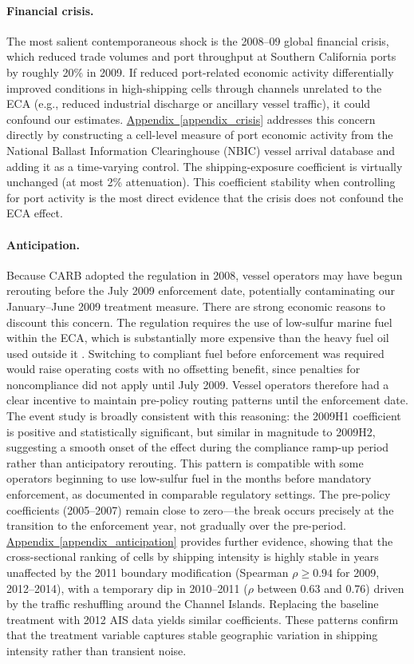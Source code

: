 \documentclass[12pt]{article}
\begin{document}
\paragraph{Financial crisis.} The most salient contemporaneous shock is the 2008--09 global financial crisis, which reduced trade volumes and port throughput at Southern California ports by roughly 20\% in 2009. If reduced port-related economic activity differentially improved conditions in high-shipping cells through channels unrelated to the ECA (e.g., reduced industrial discharge or ancillary vessel traffic), it could confound our estimates. \hyperref[appendix_crisis]{Appendix~\ref*{appendix_crisis}} addresses this concern directly by constructing a cell-level measure of port economic activity from the National Ballast Information Clearinghouse (NBIC) vessel arrival database and adding it as a time-varying control. The shipping-exposure coefficient is virtually unchanged (at most 2\% attenuation). This coefficient stability when controlling for port activity is the most direct evidence that the crisis does not confound the ECA effect.

\paragraph{Anticipation.} Because CARB adopted the regulation in 2008, vessel operators may have begun rerouting before the July 2009 enforcement date, potentially contaminating our January--June 2009 treatment measure. There are strong economic reasons to discount this concern. The regulation requires the use of low-sulfur marine fuel within the ECA, which is substantially more expensive than the heavy fuel oil used outside it \citep{Klotz2022}. Switching to compliant fuel before enforcement was required would raise operating costs with no offsetting benefit, since penalties for noncompliance did not apply until July 2009. Vessel operators therefore had a clear incentive to maintain pre-policy routing patterns until the enforcement date. The event study is broadly consistent with this reasoning: the 2009H1 coefficient is positive and statistically significant, but similar in magnitude to 2009H2, suggesting a smooth onset of the effect during the compliance ramp-up period rather than anticipatory rerouting. This pattern is compatible with some operators beginning to use low-sulfur fuel in the months before mandatory enforcement, as documented in comparable regulatory settings. The pre-policy coefficients (2005--2007) remain close to zero---the break occurs precisely at the transition to the enforcement year, not gradually over the pre-period. \hyperref[appendix_anticipation]{Appendix~\ref*{appendix_anticipation}} provides further evidence, showing that the cross-sectional ranking of cells by shipping intensity is highly stable in years unaffected by the 2011 boundary modification (Spearman $\rho \geq 0.94$ for 2009, 2012--2014), with a temporary dip in 2010--2011 ($\rho$ between 0.63 and 0.76) driven by the traffic reshuffling around the Channel Islands. Replacing the baseline treatment with 2012 AIS data yields similar coefficients. These patterns confirm that the treatment variable captures stable geographic variation in shipping intensity rather than transient noise.
\end{document}

